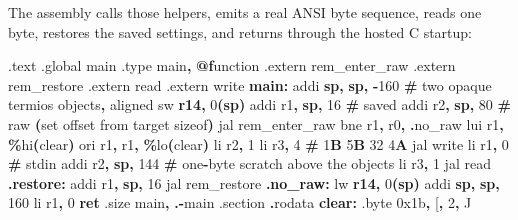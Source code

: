 \documentclass[
  oneside,
  openany]{book}
\newenvironment{Shaded}{\begin{snugshade}}{\end{snugshade}}
\newcommand{\BaseNTok}[1]{\textcolor[rgb]{0.00,0.00,0.81}{#1}}
\newcommand{\BuiltInTok}[1]{#1}
\newcommand{\ControlFlowTok}[1]{\textcolor[rgb]{0.13,0.29,0.53}{\textbf{#1}}}
\newcommand{\DataTypeTok}[1]{\textcolor[rgb]{0.13,0.29,0.53}{#1}}
\newcommand{\DecValTok}[1]{\textcolor[rgb]{0.00,0.00,0.81}{#1}}
\newcommand{\ErrorTok}[1]{\textcolor[rgb]{0.64,0.00,0.00}{\textbf{#1}}}
\newcommand{\FunctionTok}[1]{\textcolor[rgb]{0.13,0.29,0.53}{\textbf{#1}}}
\newcommand{\KeywordTok}[1]{\textcolor[rgb]{0.13,0.29,0.53}{\textbf{#1}}}
\newcommand{\NormalTok}[1]{#1}
\newcommand{\OperatorTok}[1]{\textcolor[rgb]{0.81,0.36,0.00}{\textbf{#1}}}
\newcommand{\StringTok}[1]{\textcolor[rgb]{0.31,0.60,0.02}{#1}}
\begin{document}
The assembly calls those helpers, emits a real ANSI byte sequence, reads
one byte, restores the saved settings, and returns through the hosted C
startup:

\begin{Shaded}
\begin{Highlighting}[]
\NormalTok{.text}
\NormalTok{.global main}
\NormalTok{.type main}\OperatorTok{,} \FunctionTok{@f}\NormalTok{unction}
\NormalTok{.extern rem\_enter\_raw}
\NormalTok{.extern rem\_restore}
\NormalTok{.extern read}
\NormalTok{.extern write}
\FunctionTok{main:}
\NormalTok{        addi }\KeywordTok{sp}\OperatorTok{,} \KeywordTok{sp}\OperatorTok{,} \OperatorTok{{-}}\DecValTok{160}          \OperatorTok{\#}\NormalTok{ two opaque termios objects}\OperatorTok{,}\NormalTok{ aligned}
\NormalTok{        sw   }\KeywordTok{r14}\OperatorTok{,} \DecValTok{0}\OperatorTok{(}\KeywordTok{sp}\OperatorTok{)}
\NormalTok{        addi r1}\OperatorTok{,} \KeywordTok{sp}\OperatorTok{,} \DecValTok{16}            \OperatorTok{\#}\NormalTok{ saved}
\NormalTok{        addi r2}\OperatorTok{,} \KeywordTok{sp}\OperatorTok{,} \DecValTok{80}            \OperatorTok{\#}\NormalTok{ raw }\OperatorTok{(}\NormalTok{set offset from target sizeof}\OperatorTok{)}
\NormalTok{        jal  rem\_enter\_raw}
\NormalTok{        bne  r1}\OperatorTok{,}\NormalTok{ r0}\OperatorTok{,} \OperatorTok{.}\NormalTok{no\_raw}
\NormalTok{        lui  r1}\OperatorTok{,} \OperatorTok{\%}\NormalTok{hi}\OperatorTok{(}\NormalTok{clear}\OperatorTok{)}
\NormalTok{        ori  r1}\OperatorTok{,}\NormalTok{ r1}\OperatorTok{,} \OperatorTok{\%}\NormalTok{lo}\OperatorTok{(}\NormalTok{clear}\OperatorTok{)}
\NormalTok{        li   r2}\OperatorTok{,} \DecValTok{1}
\NormalTok{        li   r3}\OperatorTok{,} \DecValTok{4}                 \OperatorTok{\#} \DecValTok{1}\ErrorTok{B} \DecValTok{5}\ErrorTok{B} \DecValTok{32} \DecValTok{4}\ErrorTok{A}
\NormalTok{        jal  write}
\NormalTok{        li   r1}\OperatorTok{,} \DecValTok{0}                 \OperatorTok{\#}\NormalTok{ stdin}
\NormalTok{        addi r2}\OperatorTok{,} \KeywordTok{sp}\OperatorTok{,} \DecValTok{144}           \OperatorTok{\#}\NormalTok{ one}\OperatorTok{{-}}\DataTypeTok{byte}\NormalTok{ scratch above the objects}
\NormalTok{        li   r3}\OperatorTok{,} \DecValTok{1}
\NormalTok{        jal  read}
\FunctionTok{.restore:}
\NormalTok{        addi r1}\OperatorTok{,} \KeywordTok{sp}\OperatorTok{,} \DecValTok{16}
\NormalTok{        jal  rem\_restore}
\FunctionTok{.no\_raw:}
\NormalTok{        lw   }\KeywordTok{r14}\OperatorTok{,} \DecValTok{0}\OperatorTok{(}\KeywordTok{sp}\OperatorTok{)}
\NormalTok{        addi }\KeywordTok{sp}\OperatorTok{,} \KeywordTok{sp}\OperatorTok{,} \DecValTok{160}
\NormalTok{        li   r1}\OperatorTok{,} \DecValTok{0}
        \ControlFlowTok{ret}
\NormalTok{.size main}\OperatorTok{,} \OperatorTok{.{-}}\NormalTok{main}
\NormalTok{.}\BuiltInTok{section} \OperatorTok{.}\NormalTok{rodata}
\FunctionTok{clear:}\NormalTok{ .}\DataTypeTok{byte} \BaseNTok{0x1b}\OperatorTok{,} \StringTok{\textquotesingle{}[\textquotesingle{}}\OperatorTok{,} \StringTok{\textquotesingle{}2\textquotesingle{}}\OperatorTok{,} \StringTok{\textquotesingle{}J\textquotesingle{}}
\end{Highlighting}
\end{Shaded}
\end{document}
